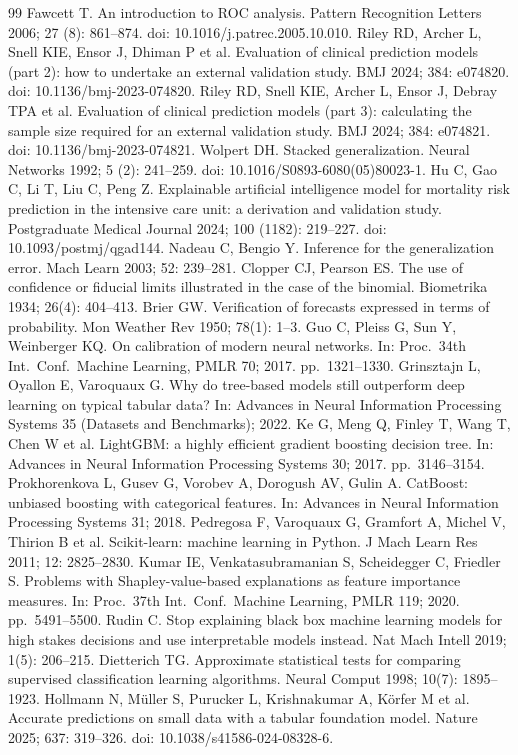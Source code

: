 \documentclass[a4paper,fleqn]{cas-dc}
\begin{document}
\begin{thebibliography}{99}
 Fawcett T. An introduction to ROC analysis. Pattern Recognition Letters 2006; 27 (8): 861--874. doi: 10.1016/\allowbreak j.patrec.2005.10.010.
 Riley RD, Archer L, Snell KIE, Ensor J, Dhiman P et al. Evaluation of clinical prediction models (part 2): how to undertake an external validation study. BMJ 2024; 384: e074820. doi: 10.1136/bmj-2023-074820.
 Riley RD, Snell KIE, Archer L, Ensor J, Debray TPA et al. Evaluation of clinical prediction models (part 3): calculating the sample size required for an external validation study. BMJ 2024; 384: e074821. doi: 10.1136/bmj-2023-074821.
 Wolpert DH. Stacked generalization. Neural Networks 1992; 5 (2): 241--259. doi: 10.1016/S0893-6080(05)80023-1.
 Hu C, Gao C, Li T, Liu C, Peng Z. Explainable artificial intelligence model for mortality risk prediction in the intensive care unit: a derivation and validation study. Postgraduate Medical Journal 2024; 100 (1182): 219--227. doi: 10.1093/postmj/qgad144.
 Nadeau C, Bengio Y. Inference for the generalization error. Mach Learn 2003; 52: 239--281.
 Clopper CJ, Pearson ES. The use of confidence or fiducial limits illustrated in the case of the binomial. Biometrika 1934; 26(4): 404--413.
 Brier GW. Verification of forecasts expressed in terms of probability. Mon Weather Rev 1950; 78(1): 1--3.
 Guo C, Pleiss G, Sun Y, Weinberger KQ. On calibration of modern neural networks. In: Proc.\ 34th Int.\ Conf.\ Machine Learning, PMLR 70; 2017. pp.\ 1321--1330.
 Grinsztajn L, Oyallon E, Varoquaux G. Why do tree-based models still outperform deep learning on typical tabular data? In: Advances in Neural Information Processing Systems 35 (Datasets and Benchmarks); 2022.
 Ke G, Meng Q, Finley T, Wang T, Chen W et al. LightGBM: a highly efficient gradient boosting decision tree. In: Advances in Neural Information Processing Systems 30; 2017. pp.\ 3146--3154.
 Prokhorenkova L, Gusev G, Vorobev A, Dorogush AV, Gulin A. CatBoost: unbiased boosting with categorical features. In: Advances in Neural Information Processing Systems 31; 2018.
 Pedregosa F, Varoquaux G, Gramfort A, Michel V, Thirion B et al. Scikit-learn: machine learning in Python. J Mach Learn Res 2011; 12: 2825--2830.
 Kumar IE, Venkatasubramanian S, Scheidegger C, Friedler S. Problems with Shapley-value-based explanations as feature importance measures. In: Proc.\ 37th Int.\ Conf.\ Machine Learning, PMLR 119; 2020. pp.\ 5491--5500.
 Rudin C. Stop explaining black box machine learning models for high stakes decisions and use interpretable models instead. Nat Mach Intell 2019; 1(5): 206--215.
 Dietterich TG. Approximate statistical tests for comparing supervised classification learning algorithms. Neural Comput 1998; 10(7): 1895--1923.
 Hollmann N, M{\"u}ller S, Purucker L, Krishnakumar A, K{\"o}rfer M et al. Accurate predictions on small data with a tabular foundation model. Nature 2025; 637: 319--326. doi: 10.1038/s41586-024-08328-6.


\end{thebibliography}
\end{document}
